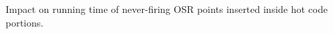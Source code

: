 \label{fig:code-quality} Impact on running time of never-firing OSR points inserted inside hot code portions.
  
  